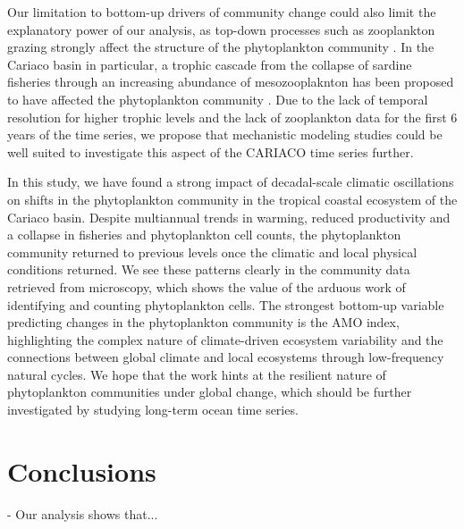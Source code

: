 \documentclass[draft]{agujournal2019}
\begin{document}
Our limitation to bottom-up drivers of community change could also limit the explanatory power of our analysis, as top-down processes such as zooplankton grazing strongly affect the structure of the phytoplankton community \cite{banas_adding_2011, acevedo-trejos_mechanisms_2015}. In the Cariaco basin in particular, a trophic cascade from the collapse of sardine fisheries through an increasing abundance of mesozooplaknton has been proposed to have affected the phytoplankton community \cite{muller-karger_scientific_2019}. Due to the lack of temporal resolution for higher trophic levels and the lack of zooplankton data for the first 6 years of the time series, we propose that mechanistic modeling studies could be well suited to investigate this aspect of the CARIACO time series further.

In this study, we have found a strong impact of decadal-scale climatic oscillations on shifts in the phytoplankton community in the tropical coastal ecosystem of the Cariaco basin. Despite multiannual trends in warming, reduced productivity and a collapse in fisheries and phytoplankton cell counts, the phytoplankton community returned to previous levels once the climatic and local physical conditions returned. We see these patterns clearly in the community data retrieved from microscopy, which shows the value of the arduous work of identifying and counting phytoplankton cells. The strongest bottom-up variable predicting changes in the phytoplankton community is the AMO index, highlighting the complex nature of climate-driven ecosystem variability and the connections between global climate and local ecosystems through low-frequency natural cycles. We hope that the work hints at the resilient nature of phytoplankton communities under global change, which should be further investigated by studying long-term ocean time series.






\section{Conclusions}

- Our analysis shows that...
\end{document}

